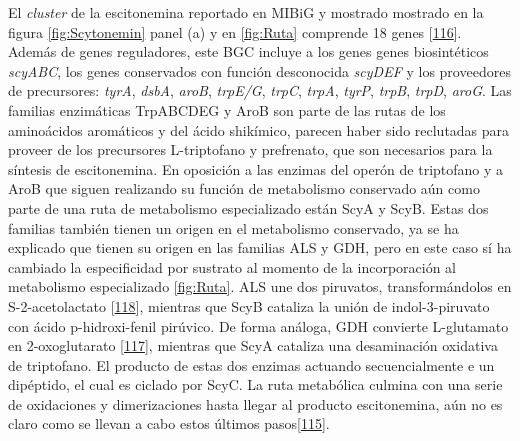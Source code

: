 \documentclass[12pt,twoside]{reedthesis}
\begin{document}
  El \emph{cluster} de la escitonemina reportado en MIBiG y mostrado
  mostrado en la figura \autoref{fig:Scytonemin} panel (a) y en
  \autoref{fig:Ruta} comprende 18 genes
  {[}\protect\hyperlink{ref-soule_comparative_2009}{116}{]}. Además de
  genes reguladores, este BGC incluye a los genes genes biosintéticos
  \emph{scyABC}, los genes conservados con función desconocida
  \emph{scyDEF} y los proveedores de precursores: \emph{tyrA},
  \emph{dsbA}, \emph{aroB}, \emph{trpE/G}, \emph{trpC}, \emph{trpA},
  \emph{tyrP}, \emph{trpB}, \emph{trpD}, \emph{aroG}. Las familias
  enzimáticas TrpABCDEG y AroB son parte de las rutas de los aminoácidos
  aromáticos y del ácido shikímico, parecen haber sido reclutadas para
  proveer de los precursores L-triptofano y prefrenato, que son necesarios
  para la síntesis de escitonemina. En oposición a las enzimas del operón
  de triptofano y a AroB que siguen realizando su función de metabolismo
  conservado aún como parte de una ruta de metabolismo especializado están
  ScyA y ScyB. Estas dos familias también tienen un origen en el
  metabolismo conservado, ya se ha explicado que tienen su origen en las
  familias ALS y GDH, pero en este caso sí ha cambiado la especificidad
  por sustrato al momento de la incorporación al metabolismo especializado
  \autoref{fig:Ruta}. ALS une dos piruvatos, transformándolos en
  S-2-acetolactato
  {[}\protect\hyperlink{ref-liu_acetohydroxyacid_2016}{118}{]}, mientras
  que ScyB cataliza la unión de indol-3-piruvato con ácido p-hidroxi-fenil
  pirúvico. De forma análoga, GDH convierte L-glutamato en 2-oxoglutarato
  {[}\protect\hyperlink{ref-engel_glutamate_2014}{117}{]}, mientras que
  ScyA cataliza una desaminación oxidativa de triptofano. El producto de
  estas dos enzimas actuando secuencialmente e un dipéptido, el cual es
  ciclado por ScyC. La ruta metabólica culmina con una serie de
  oxidaciones y dimerizaciones hasta llegar al producto escitonemina, aún
  no es claro como se llevan a cabo estos últimos
  pasos{[}\protect\hyperlink{ref-balskus_investigating_2008}{115}{]}.
  
\end{document}
